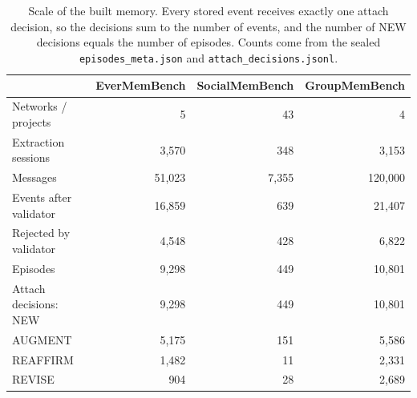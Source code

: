 \documentclass[11pt,a4paper]{article}
\begin{document}
\begin{table}[ht]
\centering\small
\begin{tabular}{@{}lrrr@{}}
\toprule
 & EverMemBench & SocialMemBench & GroupMemBench\\
\midrule
Networks / projects & 5 & 43 & 4\\
Extraction sessions & 3,570 & 348 & 3,153\\
Messages & 51,023 & 7,355 & 120,000\\
Events after validator & 16,859 & 639 & 21,407\\
Rejected by validator & 4,548 & 428 & 6,822\\
Episodes & 9,298 & 449 & 10,801\\
Attach decisions: NEW & 9,298 & 449 & 10,801\\
\quad AUGMENT & 5,175 & 151 & 5,586\\
\quad REAFFIRM & 1,482 & 11 & 2,331\\
\quad REVISE & 904 & 28 & 2,689\\
\bottomrule
\end{tabular}
\caption{Scale of the built memory. Every stored event receives exactly one attach
decision, so the decisions sum to the number of events, and the number of NEW decisions
equals the number of episodes. Counts come from the sealed \texttt{episodes\_meta.json}
and \texttt{attach\_decisions.jsonl}.}
\label{tab:memory-scale}
\end{table}
\end{document}
